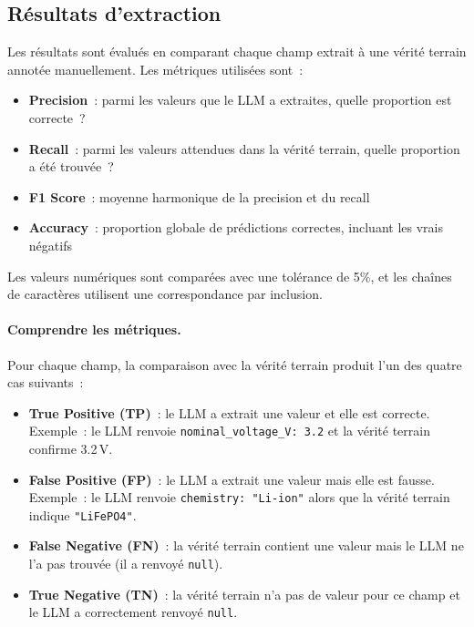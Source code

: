 \documentclass[12pt,a4paper]{article}
\begin{document}
\subsection{R\'esultats d'extraction}

Les r\'esultats sont \'evalu\'es en comparant chaque champ extrait \`a une v\'erit\'e terrain annot\'ee manuellement. Les m\'etriques utilis\'ees sont~:
\begin{itemize}[noitemsep]
    \item \textbf{Precision}~: parmi les valeurs que le LLM a extraites, quelle proportion est correcte~?
    \item \textbf{Recall}~: parmi les valeurs attendues dans la v\'erit\'e terrain, quelle proportion a \'et\'e trouv\'ee~?
    \item \textbf{F1 Score}~: moyenne harmonique de la precision et du recall
    \item \textbf{Accuracy}~: proportion globale de pr\'edictions correctes, incluant les vrais n\'egatifs
\end{itemize}

Les valeurs num\'eriques sont compar\'ees avec une tol\'erance de 5\%, et les cha\^ines de caract\`eres utilisent une correspondance par inclusion.

\paragraph{Comprendre les m\'etriques.} Pour chaque champ, la comparaison avec la v\'erit\'e terrain produit l'un des quatre cas suivants~:
\begin{itemize}[noitemsep]
    \item \textbf{True Positive (TP)}~: le LLM a extrait une valeur et elle est correcte. Exemple~: le LLM renvoie \texttt{nominal\_voltage\_V: 3.2} et la v\'erit\'e terrain confirme 3.2\,V.
    \item \textbf{False Positive (FP)}~: le LLM a extrait une valeur mais elle est fausse. Exemple~: le LLM renvoie \texttt{chemistry: "Li-ion"} alors que la v\'erit\'e terrain indique \texttt{"LiFePO4"}.
    \item \textbf{False Negative (FN)}~: la v\'erit\'e terrain contient une valeur mais le LLM ne l'a pas trouv\'ee (il a renvoy\'e \texttt{null}).
    \item \textbf{True Negative (TN)}~: la v\'erit\'e terrain n'a pas de valeur pour ce champ et le LLM a correctement renvoy\'e \texttt{null}.
\end{itemize}
\end{document}
